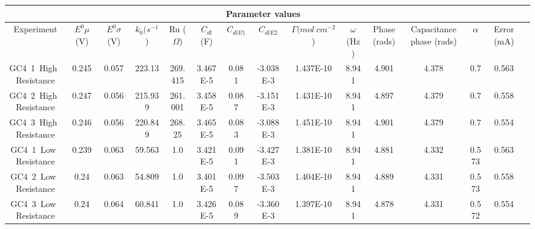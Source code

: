\documentclass[preview]{standalone}
\begin{document}
\begin{center}
\begin{tabular}{|c|c|c|c|c|c|c|c|c|c|c|c|c|c|c|}
\hline
\multicolumn{14}{|c|}{Parameter values}\\ 
\hline
Experiment & $E^0 \mu$ (V) & $E^0 \sigma$ (V) & $k_0 (s^{-1}$) & Ru ($\Omega$) & $C_{dl}$ (F) & $C_{dlE1}$ & $C_{dlE2}$ & $\Gamma (mol\:cm^{-2}$) & $\omega$ (Hz) & Phase (rads) & Capacitance phase (rads) & $\alpha$ & Error (mA)\\
\hline
GC4\ 1\ High\ Resistance & 0.245 & 0.057 & 223.13 & 269.415 & 3.467E-5 & 0.081 & -3.038E-3 & 1.437E-10 & 8.941 & 4.901 & 4.378 & 0.7 & 0.563\\
\hline
GC4\ 2\ High\ Resistance & 0.247 & 0.056 & 215.939 & 261.001 & 3.458E-5 & 0.087 & -3.151E-3 & 1.431E-10 & 8.941 & 4.897 & 4.379 & 0.7 & 0.558\\
\hline
GC4\ 3\ High\ Resistance & 0.246 & 0.056 & 220.849 & 268.25 & 3.465E-5 & 0.083 & -3.088E-3 & 1.451E-10 & 8.941 & 4.901 & 4.379 & 0.7 & 0.554\\
\hline
GC4\ 1\ Low\ Resistance & 0.239 & 0.063 & 59.563 & 1.0 & 3.421E-5 & 0.091 & -3.427E-3 & 1.381E-10 & 8.941 & 4.881 & 4.332 & 0.573 & 0.563\\
\hline
GC4\ 2\ Low\ Resistance & 0.24 & 0.063 & 54.809 & 1.0 & 3.401E-5 & 0.097 & -3.503E-3 & 1.404E-10 & 8.941 & 4.889 & 4.331 & 0.573 & 0.558\\
\hline
GC4\ 3\ Low\ Resistance & 0.24 & 0.064 & 60.841 & 1.0 & 3.426E-5 & 0.089 & -3.360E-3 & 1.397E-10 & 8.941 & 4.878 & 4.331 & 0.572 & 0.554\\
\hline
\end{tabular}
\end{center}
\end{document}
